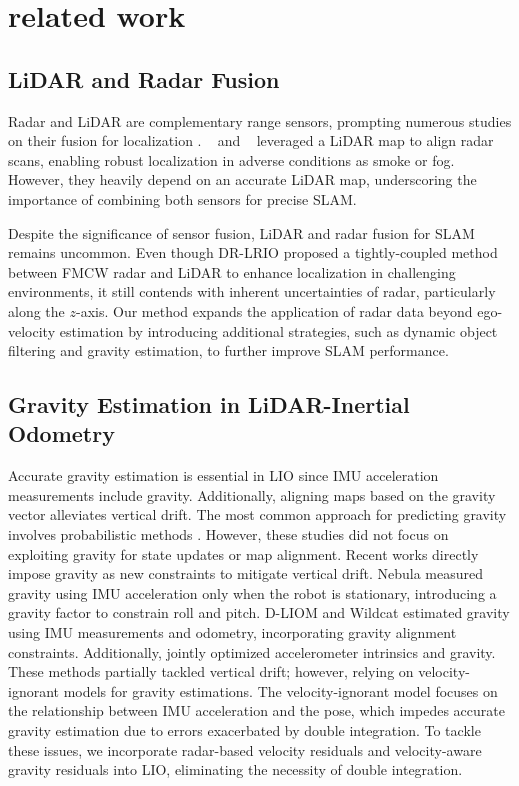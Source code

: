 \section{related work}
\label{sec:relatedwork}

\subsection{LiDAR and Radar Fusion}

Radar and \ac{LiDAR} are complementary range sensors, prompting numerous studies on their fusion for localization \cite{ROLM, YeongSang_radar, RALL}. \citeauthor{ROLM}~\cite{ROLM} and \citeauthor{YeongSang_radar}~\cite{YeongSang_radar} leveraged a \ac{LiDAR} map to align radar scans, enabling robust localization in adverse conditions as smoke or fog. However, they heavily depend on an accurate \ac{LiDAR} map, underscoring the importance of combining both sensors for precise \ac{SLAM}.

Despite the significance of sensor fusion, \ac{LiDAR} and radar fusion for \ac{SLAM} remains uncommon. Even though DR-LRIO \cite{DR-LRIO} proposed a tightly-coupled method between \ac{FMCW} radar and \ac{LiDAR} to enhance localization in challenging environments, it still contends with inherent uncertainties of radar, particularly along the $z$-axis. Our method expands the application of radar data beyond ego-velocity estimation by introducing additional strategies, such as dynamic object filtering and gravity estimation, to further improve \ac{SLAM} performance.

\subsection{Gravity Estimation in LiDAR-Inertial Odometry}
Accurate gravity estimation is essential in \ac{LIO} since \ac{IMU} acceleration measurements include gravity. Additionally, aligning maps based on the gravity vector alleviates vertical drift. The most common approach for predicting gravity involves probabilistic methods \cite{FAST-LIO, LINS}. However, these studies did not focus on exploiting gravity for state updates or map alignment. Recent works directly impose gravity as new constraints to mitigate vertical drift. Nebula \cite{agha2021nebula} measured gravity using \ac{IMU} acceleration only when the robot is stationary, introducing a gravity factor to constrain roll and pitch. D-LIOM \cite{D-LIOM} and Wildcat \cite{wildcat} estimated gravity using \ac{IMU} measurements and odometry, incorporating gravity alignment constraints. Additionally, \citeauthor{nemiroff2023joint} \cite{nemiroff2023joint} jointly optimized accelerometer intrinsics and gravity.
These methods partially tackled vertical drift; however, relying on velocity-ignorant models for gravity estimations. The velocity-ignorant model focuses on the relationship between \ac{IMU} acceleration and the pose, which impedes accurate gravity estimation due to errors exacerbated by double integration. To tackle these issues, we incorporate radar-based velocity residuals and velocity-aware gravity residuals into \ac{LIO}, eliminating the necessity of double integration.

